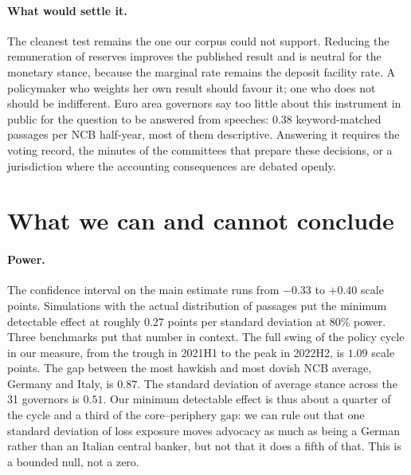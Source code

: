 \documentclass[11pt]{article}
\theoremstyle{plain}
\begin{document}
\paragraph{What would settle it.}
The cleanest test remains the one our corpus could not support. Reducing the remuneration of reserves improves the published result and is neutral for the monetary stance, because the marginal rate remains the deposit facility rate. A policymaker who weights her own result should favour it; one who does not should be indifferent. Euro area governors say too little about this instrument in public for the question to be answered from speeches: 0.38 keyword-matched passages per NCB half-year, most of them descriptive. Answering it requires the voting record, the minutes of the committees that prepare these decisions, or a jurisdiction where the accounting consequences are debated openly.

\section{What we can and cannot conclude}\label{sec:limits}

\paragraph{Power.} The confidence interval on the main estimate runs from $-0.33$ to $+0.40$ scale points. Simulations with the actual distribution of passages put the minimum detectable effect at roughly $0.27$ points per standard deviation at 80\% power. Three benchmarks put that number in context. The full swing of the policy cycle in our measure, from the trough in 2021H1 to the peak in 2022H2, is $1.09$ scale points. The gap between the most hawkish and most dovish NCB average, Germany and Italy, is $0.87$. The standard deviation of average stance across the 31 governors is $0.51$. Our minimum detectable effect is thus about a quarter of the cycle and a third of the core--periphery gap: we can rule out that one standard deviation of loss exposure moves advocacy as much as being a German rather than an Italian central banker, but not that it does a fifth of that. This is a bounded null, not a zero.
\end{document}
